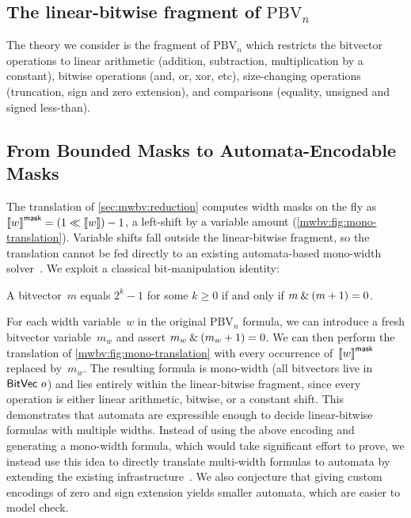 \subsection{The linear-bitwise fragment of $\text{PBV}_n$}

The theory we consider is the fragment of $\text{PBV}_n$ which restricts the
bitvector operations to linear arithmetic (addition, subtraction,
multiplication by a constant), bitwise operations (and, or, xor, etc),
size-changing operations (truncation, sign and zero extension), and comparisons (equality, unsigned and signed less-than).

\subsection{From Bounded Masks to Automata-Encodable Masks}
\label{mwbv:sec:mask-substitution}

The translation of \cref{sec:mwbv:reduction} computes width masks on the fly as
$\left\llbracket w \right\rrbracket^{\mathsf{mask}} = (1 \ll \left\llbracket w \right\rrbracket) - 1$, a left-shift by a variable
amount (\cref{mwbv:fig:mono-translation}).  Variable shifts fall outside the
linear-bitwise fragment, so the translation cannot be fed directly to an existing
automata-based mono-width solver~\citep{bhat2025certified}.
%
We exploit a classical bit-manipulation identity:
%
\begin{lemma}\label{mwbv:lem:mask-char}
  A bitvector~$m$ equals $2^k - 1$ for some $k \geq 0$
  if and only if $m \mathbin{\&} (m + 1) = 0$.
\end{lemma}
%
\noindent
For each width variable~$w$ in the original $\text{PBV}_n$ formula, we
can introduce a fresh bitvector variable~$m_w$ and assert
$m_w \mathbin{\&} (m_w + 1) = 0$.
We can then perform the translation of \cref{mwbv:fig:mono-translation}
with every occurrence of~$\left\llbracket w \right\rrbracket^{\mathsf{mask}}$ replaced by~$m_w$.
The resulting formula is mono-width (all bitvectors live in~$\mathsf{BitVec}~{o}$)
and lies entirely within the linear-bitwise fragment,
since every operation is either linear arithmetic, bitwise, or a constant shift.
%
This demonstrates that automata are expressible enough to decide linear-bitwise
formulas with multiple widths.
%
Instead of using the above encoding and generating a mono-width formula, which
would take significant effort to prove, we instead use this idea to directly
translate multi-width formulas to automata by extending the existing
infrastructure~\citep{bhat2025certified}.
%
We also conjecture that giving custom encodings of zero and sign extension yields
smaller automata, which are easier to model check.

